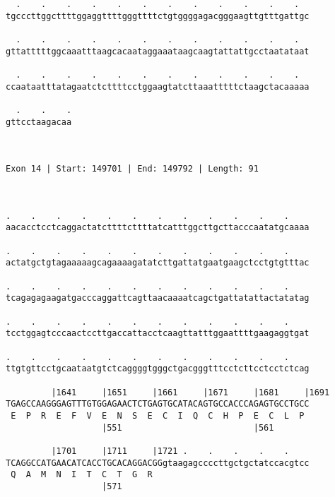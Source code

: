 \documentclass{article}
\begin{document}
\begin{Verbatim}
  .    .    .    .    .    .    .    .    .    .    .    .  
tgcccttggcttttggaggttttgggttttctgtggggagacgggaagttgtttgattgc
                                                            
  .    .    .    .    .    .    .    .    .    .    .    .  
gttatttttggcaaatttaagcacaataggaaataagcaagtattattgcctaatataat
                                                            
  .    .    .    .    .    .    .    .    .    .    .    .  
ccaataatttatagaatctcttttcctggaagtatcttaaatttttctaagctacaaaaa
                                                            
  .    .    .
gttcctaagacaa
             
             
 
Exon 14 | Start: 149701 | End: 149792 | Length: 91



.    .    .    .    .    .    .    .    .    .    .    .    
aacacctcctcaggactatcttttcttttatcatttggcttgcttacccaatatgcaaaa
                                                            
.    .    .    .    .    .    .    .    .    .    .    .    
actatgctgtagaaaaagcagaaaagatatcttgattatgaatgaagctcctgtgtttac
                                                            
.    .    .    .    .    .    .    .    .    .    .    .    
tcagagagaagatgacccaggattcagttaacaaaatcagctgattatattactatatag
                                                            
.    .    .    .    .    .    .    .    .    .    .    .    
tcctggagtcccaactccttgaccattacctcaagttatttggaattttgaagaggtgat
                                                            
.    .    .    .    .    .    .    .    .    .    .    .    
ttgtgttcctgcaataatgtctcaggggtgggctgacgggtttcctcttcctcctctcag
                                                            
         |1641     |1651     |1661     |1671     |1681     |1691
TGAGCCAAGGGAGTTTGTGGAGAACTCTGAGTGCATACAGTGCCACCCAGAGTGCCTGCC
 E  P  R  E  F  V  E  N  S  E  C  I  Q  C  H  P  E  C  L  P 
                   |551                          |561       
  
         |1701     |1711     |1721 .    .    .    .    .    
TCAGGCCATGAACATCACCTGCACAGGACGGgtaagagccccttgctgctatccacgtcc
 Q  A  M  N  I  T  C  T  G  R                               
                   |571                                     
  

\end{Verbatim}
\end{document}
